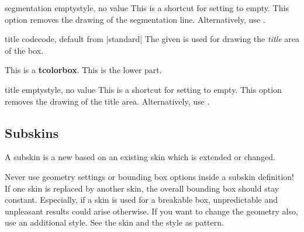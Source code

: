 \begin{docTcbKey}{segmentation empty}{}{style, no value}
  This is a shortcut for setting   to empty.
  This option removes the drawing of the segmentation line.
  Alternatively, use .
\end{docTcbKey}



\clearpage
\begin{docTcbKey}{title code}{}{code, default from |standard|}
  The given  is used for drawing the
  \emph{title} area of the box.
\begin{dispExample}

\begin{tcolorbox}[enhanced,title=My title,title code={
  \path[draw=yellow,solid,decorate,line width=2mm,
    decoration={coil,aspect=0,segment length=10.1mm}]
    ([xshift=1mm]title.west) -- ([xshift=-1mm]title.east);}]
This is a \textbf{tcolorbox}.
\tcblower
This is the lower part.
\end{tcolorbox}
\end{dispExample}
\end{docTcbKey}


\begin{docTcbKey}{title empty}{}{style, no value}
  This is a shortcut for setting   to empty.
  This option removes the drawing of the title area.
  Alternatively, use .
\end{docTcbKey}

\clearpage
\subsection{Subskins}\label{subsec:subskins}
A subskin is a new  based on an existing skin which
is extended or changed.

\begin{marker}
Never use geometry settings or bounding box options inside a subskin definition!
If one skin is replaced by another skin, the overall bounding box should stay
constant. Especially, if a skin is used for a breakable box, unpredictable
and unpleasant results could arise otherwise. If you want to change the
geometry also, use an additional style. See the skin  and
the style  as pattern.
\end{marker}

